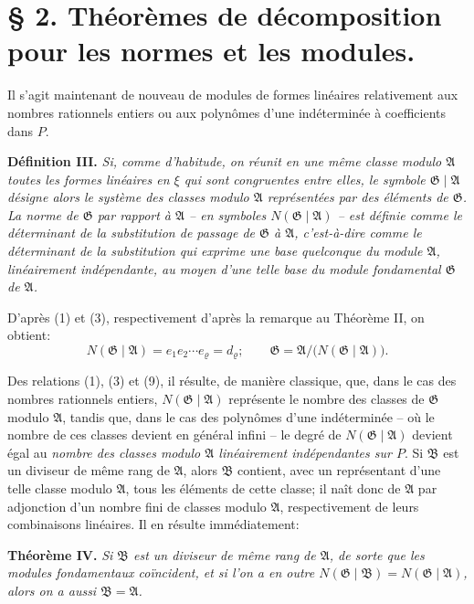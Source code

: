 \documentclass[11pt]{article}
\providecommand{\Amod}{\mathfrak A}
\providecommand{\Bmod}{\mathfrak B}
\providecommand{\Gmod}{\mathfrak G}
\providecommand{\Norm}{N}
\begin{document}
\fi


\setcounter{footnote}{7}
\section*{\S{} 2. Théorèmes de décomposition pour les normes et les modules.}

Il s'agit maintenant de nouveau de modules de formes linéaires relativement aux nombres rationnels entiers ou aux polynômes d'une indéterminée à coefficients dans $P$.

\medskip
\noindent\textbf{Définition III.} \emph{Si, comme d'habitude, on réunit en une même classe modulo $\Amod$ toutes les formes linéaires en $\xi$ qui sont congruentes entre elles, le symbole $\Gmod\mid\Amod$ désigne alors le système des classes modulo $\Amod$ représentées par des éléments de $\Gmod$. La norme de $\Gmod$ par rapport à $\Amod$ -- en symboles $\Norm(\Gmod\mid\Amod)$ -- est définie comme le déterminant de la substitution de passage de $\Gmod$ à $\Amod$, c'est-à-dire comme le déterminant de la substitution qui exprime une base quelconque du module $\Amod$, linéairement indépendante, au moyen d'une telle base du module fondamental $\Gmod$ de $\Amod$.}

D'après (1) et (3), respectivement d'après la remarque au Théorème II, on obtient:
\begin{equation}
 \Norm(\Gmod\mid\Amod)=e_1e_2\cdots e_\varrho=d_\varrho;
 \qquad
 \Gmod=\Amod/\bigl(\Norm(\Gmod\mid\Amod)\bigr).
\tag{9}
\end{equation}

Des relations (1), (3) et (9), il résulte, de manière classique, que, dans le cas des nombres rationnels entiers, $\Norm(\Gmod\mid\Amod)$ représente le nombre des classes de $\Gmod$ modulo $\Amod$, tandis que, dans le cas des polynômes d'une indéterminée -- où le nombre de ces classes devient en général infini -- le degré de $\Norm(\Gmod\mid\Amod)$ devient égal au \emph{nombre des classes modulo $\Amod$ linéairement indépendantes sur $P$}. Si $\Bmod$ est un diviseur de même rang de $\Amod$, alors $\Bmod$ contient, avec un représentant d'une telle classe modulo $\Amod$, tous les éléments de cette classe; il naît donc de $\Amod$ par adjonction d'un nombre fini de classes modulo $\Amod$, respectivement de leurs combinaisons linéaires. Il en résulte immédiatement:

\medskip
\noindent\textbf{Théorème IV.} \emph{Si $\Bmod$ est un diviseur de même rang de $\Amod$, de sorte que les modules fondamentaux coïncident, et si l'on a en outre $\Norm(\Gmod\mid\Bmod)=\Norm(\Gmod\mid\Amod)$, alors on a aussi $\Bmod=\Amod$.}
\end{document}
